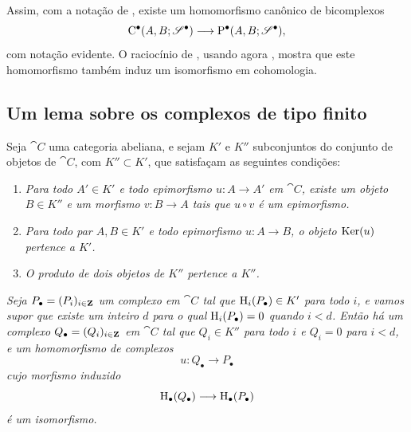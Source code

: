 \begin{env}[11.8.10]
\label{0.11.8.10}
Assim, com a notação de , existe um
homomorfismo canônico de bicomplexos
\[
  \mathrm{C}^\bullet(A,B;\mathscr{S}^\bullet)
  \longrightarrow
  \mathrm{P}^\bullet(A,B;\mathscr{S}^\bullet),
\]
com notação evidente.
O raciocínio de , usando agora , mostra que
este homomorfismo também induz um isomorfismo em cohomologia.
\end{env}

\subsection{Um lema sobre os complexos de tipo finito}
\label{subsection:0.11.9}

\begin{proposition}[11.9.1]
\label{0.11.9.1}
Seja $\cat{C}$ uma categoria abeliana, e sejam $K'$ e $K''$ subconjuntos
do conjunto de objetos de $\cat{C}$, com $K''\subset K'$, que satisfaçam
as seguintes condições:
\begin{enumerate}
  \item[{\rm(i)}]
  \emph{Para todo $A'\in K'$ e todo epimorfismo $u:A\to A'$ em
  $\cat{C}$, existe um objeto $B\in K''$ e um morfismo $v:B\to A$
  tais que $u\circ v$ é um epimorfismo.}

  \item[{\rm(ii)}]
  \emph{Para todo par $A,B\in K'$ e todo epimorfismo $u:A\to B$,
  o objeto $\operatorname{Ker}(u)$ pertence a $K'$.}

  \item[{\rm(iii)}]
  \emph{O produto de dois objetos de $K''$ pertence a $K''$.}
\end{enumerate}

\emph{Seja $P_\bullet=(P_i)_{i\in\mathbf{Z}}$ um complexo em $\cat{C}$ tal
que $\mathrm{H}_i(P_\bullet)\in K'$ para todo $i$, e vamos supor que existe um
inteiro $d$ para o qual $\mathrm{H}_i(P_\bullet)=0$ quando $i<d$.
Então há um complexo $Q_\bullet=(Q_i)_{i\in\mathbf{Z}}$ em $\cat{C}$
tal que $Q_i\in K''$ para todo $i$ e $Q_i=0$ para $i<d$, e um
homomorfismo de complexos
\[
  u:Q_\bullet\longrightarrow P_\bullet
\]
cujo morfismo induzido
\[
  \mathrm{H}_\bullet(Q_\bullet)\longrightarrow\mathrm{H}_\bullet(P_\bullet)
\]
é um isomorfismo.}
\end{proposition}

